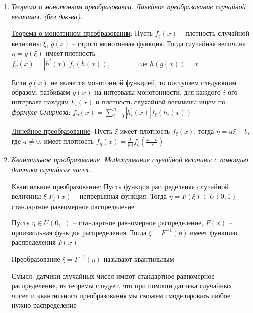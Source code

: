 \begin{enumerate}
    \hyperlink{standardizationofrandomvalue}{Стандартизация}: Пусть имеется случайная величина $\xi$. Соответствующей ей стандартной величиной называется
    случайная величина $\eta = \frac{\xi - E\xi}{\sigma}$

    $E\eta = 0; D\eta = 1$

    \hyperlink{randomvaluetransformation}{Преобразование}: Если $\xi$ -- дискретная случайная величина, то ее законы распределения находятся просто: значения $x_i$ в верхней строке заменяем $g(x_i)$, вероятности остаются прежние.
    
    \item \textit{Теорема о монотонном преобразовании. Линейное преобразование случайной величины. (без док-ва).}
    
    \hyperlink{monotonoustransformationtheorem}{Теорема о монотонном преобразовании}: \Ths Пусть $f_\xi(x)$ -- плотность случайной величины $\xi$, $g(x)$ -- строго монотонная функция. Тогда 
    случайная величина $\eta = g(\xi)$ имеет плотность $f_\eta(x) = |h^\prime(x)| f_\xi(h(x)), \qquad\qquad \text{где } h(g(x)) = x$

    Если $g(x)$ не является монотонной функцией, то поступаем следующим образом: разбиваем $g(x)$ на интервалы монотонности, 
    для каждого $i$-ого интервала находим $h_i(x)$ и плотность случайной величины ищем по \textit{формуле Смирнова}: 
    $f_\eta(x) = \sum_{i = 0}^n |h_i^\prime(x)| f_\xi(h_i(x))$
    
    \hyperlink{lineartransformation}{Линейное преобразование}: \Ths Пусть $\xi$ имеет плотность $f_\xi(x)$, тогда $\eta = a\xi + b$, где $a \neq 0$, имеет плотность $f_\eta(x) = \frac{1}{|a|}f_\xi\left(\frac{x - b}{a}\right)$
    
    \item \textit{Квантильное преобразование. Моделирование случайной величины с помощью датчика случайных чисел.}

    \hyperlink{quantiletransformation}{Квантильное преобразование}: Пусть функция распределения случайной величины $\xi$ $F_\xi(x)$ -- непрерывная функция. 
    Тогда $\eta = F(\xi) \in U(0, 1)$ -- стандартное равномерное распределение

    Пусть $\eta \in U(0, 1)$ -- стандартное равномерное распределение, $F(x)$ -- произвольная функция распределения. 
    Тогда $\xi = F^{-1}(\eta)$ имеет функцию распределения $F(x)$

    Преобразование $\xi = F^{-1}(\eta)$ называют квантильным

    Смысл: датчики случайных чисел имеют стандартное равномерное распределение, из теоремы следует, что при помощи
    датчика случайных чисел и квантильного преобразования мы сможем смоделировать любое нужно распределение



\end{enumerate}

